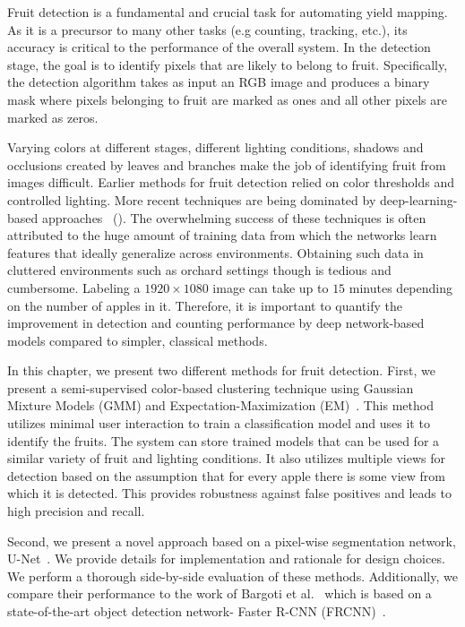 Fruit detection is a fundamental and crucial task for automating yield mapping. As it is a precursor to many other tasks (e.g counting, tracking, etc.), its accuracy is critical to the performance of the overall system. In the detection stage, the goal is to identify pixels that are likely to belong to fruit. Specifically, the detection algorithm takes as input an RGB image and produces a binary mask where pixels belonging to fruit are marked as ones and all other pixels are marked as zeros.

Varying colors at different stages, different lighting conditions, shadows and occlusions created by leaves and branches make the job of identifying fruit from images difficult. Earlier methods for fruit detection relied on color thresholds and controlled lighting. More recent techniques are being dominated by deep-learning-based approaches ~(\cite{chen_counting_2017, hani_apple_2018}). The overwhelming success of these techniques is often attributed to the huge amount of training data from which the networks learn features that ideally generalize across environments. Obtaining such data in cluttered environments such as orchard settings though is tedious and cumbersome. Labeling a $1920\times1080$ image can take up to $15$ minutes depending on the number of apples in it. Therefore, it is important to quantify the improvement in detection and counting performance by deep network-based models compared to simpler, classical methods.


In this chapter, we present two different methods for fruit detection. First, we present a semi-supervised color-based clustering technique using Gaussian Mixture Models (GMM) and Expectation-Maximization (EM)~\cite{em}. This method utilizes minimal user interaction to train a classification model and uses it to identify the fruits. The system can store trained models that can be used for a similar variety of fruit and lighting conditions. It also utilizes multiple views for detection based on the assumption that for every apple there is some view from which it is detected. This provides robustness against false positives and leads to high precision and recall.

Second, we present a novel approach based on a pixel-wise segmentation network, U-Net~\cite{ronneberger_u-net:_2015}. We provide details for implementation and rationale for design choices. We perform a thorough side-by-side evaluation of these methods. Additionally, we compare their performance to the work of Bargoti et al.~\cite{bargoti_deep_2017} which is based on a state-of-the-art object detection network- Faster R-CNN (FRCNN)~\cite{ren_faster_2015}.



